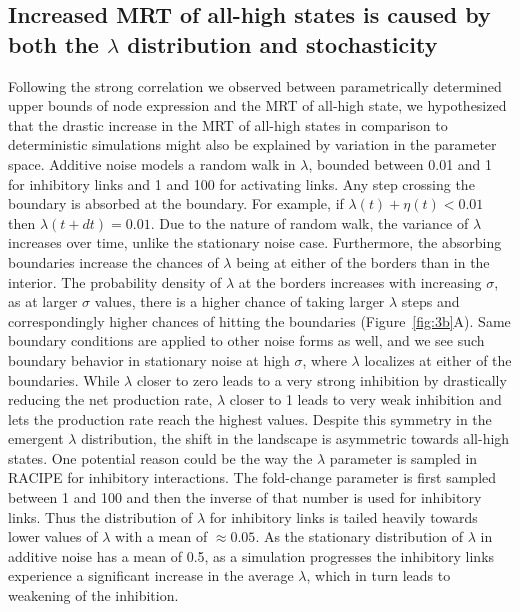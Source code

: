 \documentclass[11pt]{article}
\begin{document}
\subsection{Increased MRT of all-high states is caused by both the $\lambda$ distribution and stochasticity}

Following the strong correlation we observed between parametrically determined upper bounds of node expression and the MRT of all-high state, we hypothesized that the drastic increase in the MRT of all-high states in comparison to deterministic simulations might also be explained by variation in the parameter space. Additive noise models a random walk in $\lambda$, bounded between 0.01 and 1 for inhibitory links and 1 and 100 for activating links. Any step crossing the boundary is absorbed at the boundary. For example, if $\lambda(t) + \eta(t) < 0.01$ then $\lambda(t+dt) = 0.01$. Due to the nature of random walk, the variance of $\lambda$ increases over time, unlike the stationary noise case. Furthermore, the absorbing boundaries increase the chances of $\lambda$ being at either of the borders than in the interior. The probability density of $\lambda$ at the borders increases with increasing $\sigma$, as at larger $\sigma$ values, there is a higher chance of taking larger $\lambda$ steps and correspondingly higher chances of hitting the boundaries (Figure~\ref{fig:3b}A). Same boundary conditions are applied to other noise forms as well, and we see such boundary behavior in stationary noise at high $\sigma$, where $\lambda$ localizes at either of the boundaries. While $\lambda$ closer to zero leads to a very strong inhibition by drastically reducing the net production rate, $\lambda$ closer to 1 leads to very weak inhibition and lets the production rate reach the highest values. Despite this symmetry in the emergent $\lambda$ distribution, the shift in the landscape is asymmetric towards all-high states. One potential reason could be the way the $\lambda$ parameter is sampled in RACIPE for inhibitory interactions. The fold-change parameter is first sampled between 1 and 100 and then the inverse of that number is used for inhibitory links. Thus the distribution of $\lambda$ for inhibitory links is tailed heavily towards lower values of $\lambda$ with a mean of $\approx0.05$. As the stationary distribution of $\lambda$ in additive noise has a mean of 0.5, as a simulation progresses the inhibitory links experience a significant increase in the average $\lambda$, which in turn leads to weakening of the inhibition.
\end{document}
